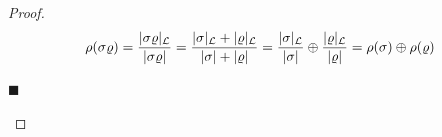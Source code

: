 \begin{proof}
	\begin{align*}
		\rho(\sigma\varrho)
		= \dfrac{|\sigma\varrho|_{\mathcal{L}}}{|\sigma\varrho|}
		= \dfrac{|\sigma|_{\mathcal{L}} + |\varrho|_{\mathcal{L}}}{|\sigma| + |\varrho|}
		= \dfrac{|\sigma|_{\mathcal{L}}}{|\sigma|} \oplus \dfrac{|\varrho|_{\mathcal{L}}}{|\varrho|}
		= \rho(\sigma) \oplus \rho(\varrho)
	\end{align*}
	\vspace{-4.8em}
	\begin{flushright}
		$\blacksquare$
	\end{flushright}
\end{proof}

\begin{figure}
	\centering
\end{figure}
